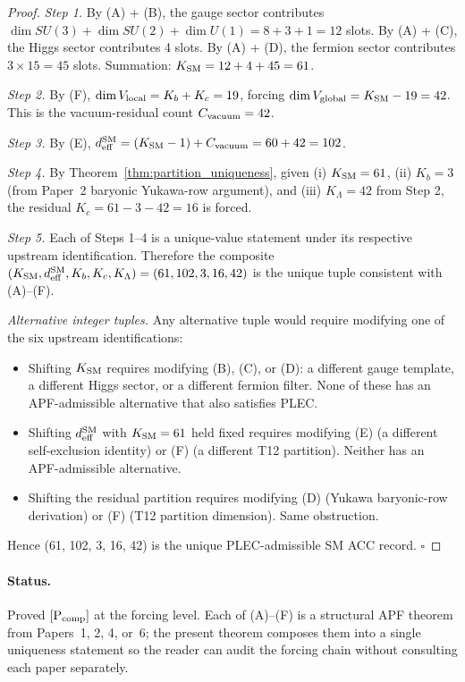 \documentclass[11pt]{article}
\theoremstyle{plain}
\theoremstyle{definition}
\theoremstyle{remark}
\begin{document}
\begin{proof}
\emph{Step 1.}  By (A) + (B), the gauge sector contributes $\dim SU(3) + \dim SU(2) + \dim U(1) = 8 + 3 + 1 = 12$ slots.  By (A) + (C), the Higgs sector contributes 4 slots.  By (A) + (D), the fermion sector contributes $3 \times 15 = 45$ slots.  Summation: $K_{\rm SM} = 12 + 4 + 45 = 61$.

\emph{Step 2.}  By (F), $\dim V_{\rm local} = K_b + K_c = 19$, forcing $\dim V_{\rm global} = K_{\rm SM} - 19 = 42$.  This is the vacuum-residual count $C_{\rm vacuum} = 42$.

\emph{Step 3.}  By (E), $d_{\rm eff}^{\rm SM} = (K_{\rm SM} - 1) + C_{\rm vacuum} = 60 + 42 = 102$.

\emph{Step 4.}  By Theorem~\ref{thm:partition_uniqueness}, given (i) $K_{\rm SM} = 61$, (ii) $K_b = 3$ (from Paper~2 baryonic Yukawa-row argument), and (iii) $K_\Lambda = 42$ from Step 2, the residual $K_c = 61 - 3 - 42 = 16$ is forced.

\emph{Step 5.}  Each of Steps 1--4 is a unique-value statement under its respective upstream identification.  Therefore the composite $(K_{\rm SM}, d_{\rm eff}^{\rm SM}, K_b, K_c, K_\Lambda) = (61, 102, 3, 16, 42)$ is the unique tuple consistent with (A)--(F).

\emph{Alternative integer tuples.}  Any alternative tuple would require modifying one of the six upstream identifications:
\begin{itemize}[leftmargin=2em,itemsep=2pt]
  \item Shifting $K_{\rm SM}$ requires modifying (B), (C), or (D): a different gauge template, a different Higgs sector, or a different fermion filter. None of these has an APF-admissible alternative that also satisfies PLEC.
  \item Shifting $d_{\rm eff}^{\rm SM}$ with $K_{\rm SM} = 61$ held fixed requires modifying (E) (a different self-exclusion identity) or (F) (a different T12 partition). Neither has an APF-admissible alternative.
  \item Shifting the residual partition requires modifying (D) (Yukawa baryonic-row derivation) or (F) (T12 partition dimension). Same obstruction.
\end{itemize}
Hence (61, 102, 3, 16, 42) is the unique PLEC-admissible SM ACC record.  $\square$
\end{proof}

\paragraph{Status.}  Proved $[\text{P}_{\rm comp}]$ at the forcing level.  Each of (A)--(F) is a structural APF theorem from Papers~1, 2, 4, or~6; the present theorem composes them into a single uniqueness statement so the reader can audit the forcing chain without consulting each paper separately.
\end{document}
